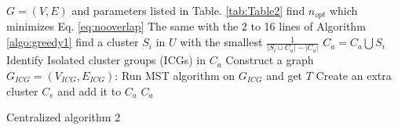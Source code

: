 \begin{algorithm}
\begin{algorithmic}[1]
\REQUIRE \(G=(V, E)\) and parameters listed in Table. \ref{tab:Table2}
\STATE find \(n_{opt}\) which minimizes Eq. \ref{eq:nooverlap}
  \STATE The same with the 2 to 16 lines of Algorithm \ref{algo:greedy1}
  	\REPEAT
		\STATE find a cluster \(S_i\) in \(U\) with the smallest \(\frac{1}{\left|S_i\cup C_a\right| - \left|C_a\right|}\)
		\STATE \(C_a=C_a\bigcup S_i\)
	\STATE Identify Isolated cluster groups (ICGs) in \(C_a\)
	\STATE Construct a graph \(G_{ICG}=(V_{ICG}, E_{ICG})\):
 \STATE Run MST algorithm on \(G_{ICG}\) and get \(T\)
		\STATE Create an extra cluster \(C_e\) and add it to \(C_a\)
	\ENDFOR
	\ENSURE \(C_a\)
\end{algorithmic}
\caption{Centralized algorithm 2}
\label{algo:greedy2}
\end{algorithm}

\begin{comment}
We will use a simple example to demonstrate the two algorithms above. Fig. \ref{fig:AlgorithmExampleNew}(a) plots a graph consisting of a total of 12 nodes. Assume we use the parameters associated with energy listed in Table 1 and the optimal \(n_{opt}\)=4. For simplicity, we also assume that the \(cond(S_i)<\gamma\) if \(\left|S_i\right| \geq p = 3\). Using the generated candidate cluster sets, 4 clusters are obtained using the first algorithm and illustrated in Fig. \ref{fig:AlgorithmExampleNew}(b). Note that all these 4 clusters are connected through the overlapping nodes. Using the second algorithm, a total of 3 clusters are generated after all the 12 nodes have been covered (see Fig. \ref{fig:AlgorithmExampleNew}(c)). However, these clusters do not overlap. Therefore, two extra clusters are generated to connect these isolated clusters. Note that since the minimum number of vibration patterns is 3, each extra cluster contains three nodes. The final clustering result of the second algorithm is shown in Fig. \ref{fig:AlgorithmExampleNew}(d). The total amount of energy using the generated clusters from the first algorithm is about \(0.88\) times of that of the second algorithm. 

\begin{figure}
	\centering
		\texttt{[image: AlgorithmExampleNew.eps]}
	\caption{Example of using the Proposed Algorithms (a) Graph G(V,E), (b) The 4 Clusters Generated from the \(1^{st}\) Algorithm (c) Isolated Cluster Groups from the \(2^{nd}\) Algorithm (e) Final 5 Clusters from the \(2^{nd}\) Algorithm}
	\label{fig:AlgorithmExampleNew}
\end{figure}
\end{comment}

